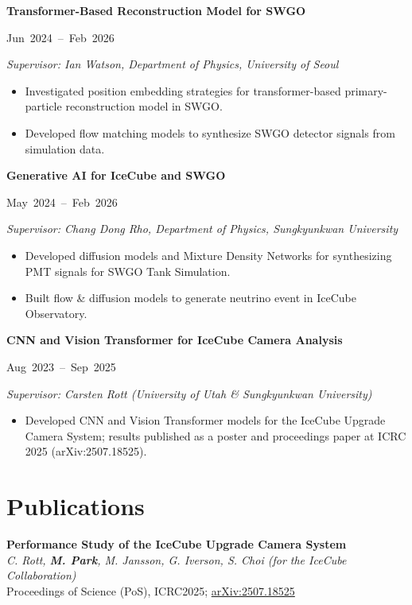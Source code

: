 \documentclass[11pt, a4paper]{article}
\newcommand{\experienceitem}[4]{
    \begin{tcolorbox}[
        colback=lightgray,
        colframe=primary,
        boxrule=0pt,
        leftrule=3pt,
        arc=0pt,
        left=5pt,
        right=5pt,
        top=5pt,
        bottom=5pt
    ]
    \begin{minipage}[t]{0.74\linewidth}\raggedright\textbf{#1}\end{minipage}%
    \hfill%
    \begin{minipage}[t]{0.25\linewidth}\raggedleft\mbox{\color{primary}\small #2}\end{minipage}

    \textit{#3}

    #4
    \end{tcolorbox}
    \vspace{3pt}
}
\begin{document}
\experienceitem{Transformer-Based Reconstruction Model for SWGO}{Jun 2024 -- Feb 2026}{Supervisor: Ian Watson, Department of Physics, University of Seoul}{
    \begin{itemize}[leftmargin=*, itemsep=2pt]
        \item Investigated position embedding strategies for transformer-based primary-particle reconstruction model in SWGO.
        \item Developed flow matching models to synthesize SWGO detector signals from simulation data.
    \end{itemize}
}

\experienceitem{Generative AI for IceCube and SWGO}{May 2024 -- Feb 2026}{Supervisor: Chang Dong Rho, Department of Physics, Sungkyunkwan University}{
    \begin{itemize}[leftmargin=*, itemsep=2pt]
        \item Developed diffusion models and Mixture Density Networks for synthesizing PMT signals for SWGO Tank Simulation.
        \item Built flow \& diffusion models to generate neutrino event in IceCube Observatory.
    \end{itemize}
}

\experienceitem{CNN and Vision Transformer for IceCube Camera Analysis}{Aug 2023 -- Sep 2025}{Supervisor: Carsten Rott (University of Utah \& Sungkyunkwan University)}{
    \begin{itemize}[leftmargin=*, itemsep=2pt]
        \item Developed CNN and Vision Transformer models for the IceCube Upgrade Camera System; results published as a poster and proceedings paper at ICRC 2025 (arXiv:2507.18525).
    \end{itemize}
}

\section{Publications}

\newcommand{\publication}[3]{
    \vspace{4pt}
    \noindent
    \textbf{#1} \\
    \textit{#2} \\
    {\small #3}
    \vspace{6pt}
}

\publication{Performance Study of the IceCube Upgrade Camera System}
{C. Rott, \textbf{\textit{M. Park}}, M. Jansson, G. Iverson, S. Choi (for the IceCube Collaboration)}
{Proceedings of Science (PoS), ICRC2025; \href{https://arxiv.org/abs/2507.18525}{arXiv:2507.18525}}
\end{document}
